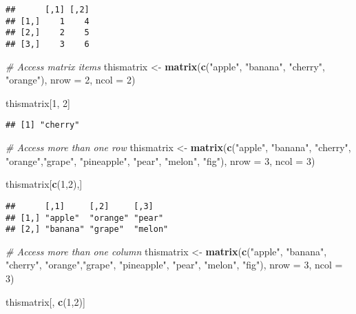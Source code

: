 \documentclass[
]{article}
\newenvironment{Shaded}{\begin{snugshade}}{\end{snugshade}}
\newcommand{\AttributeTok}[1]{\textcolor[rgb]{0.13,0.29,0.53}{#1}}
\newcommand{\CommentTok}[1]{\textcolor[rgb]{0.56,0.35,0.01}{\textit{#1}}}
\newcommand{\DecValTok}[1]{\textcolor[rgb]{0.00,0.00,0.81}{#1}}
\newcommand{\FunctionTok}[1]{\textcolor[rgb]{0.13,0.29,0.53}{\textbf{#1}}}
\newcommand{\NormalTok}[1]{#1}
\newcommand{\OtherTok}[1]{\textcolor[rgb]{0.56,0.35,0.01}{#1}}
\newcommand{\StringTok}[1]{\textcolor[rgb]{0.31,0.60,0.02}{#1}}
\begin{document}
\begin{verbatim}
##      [,1] [,2]
## [1,]    1    4
## [2,]    2    5
## [3,]    3    6
\end{verbatim}

\begin{Shaded}
\begin{Highlighting}[]
\CommentTok{\# Access matrix items}
\NormalTok{thismatrix }\OtherTok{\textless{}{-}} \FunctionTok{matrix}\NormalTok{(}\FunctionTok{c}\NormalTok{(}\StringTok{"apple"}\NormalTok{, }\StringTok{"banana"}\NormalTok{, }\StringTok{"cherry"}\NormalTok{, }\StringTok{"orange"}\NormalTok{), }\AttributeTok{nrow =} \DecValTok{2}\NormalTok{, }\AttributeTok{ncol =} \DecValTok{2}\NormalTok{)}

\NormalTok{thismatrix[}\DecValTok{1}\NormalTok{, }\DecValTok{2}\NormalTok{]}
\end{Highlighting}
\end{Shaded}

\begin{verbatim}
## [1] "cherry"
\end{verbatim}

\begin{Shaded}
\begin{Highlighting}[]
\CommentTok{\# Access more than one row}
\NormalTok{thismatrix }\OtherTok{\textless{}{-}} \FunctionTok{matrix}\NormalTok{(}\FunctionTok{c}\NormalTok{(}\StringTok{"apple"}\NormalTok{, }\StringTok{"banana"}\NormalTok{, }\StringTok{"cherry"}\NormalTok{, }\StringTok{"orange"}\NormalTok{,}\StringTok{"grape"}\NormalTok{, }\StringTok{"pineapple"}\NormalTok{, }\StringTok{"pear"}\NormalTok{, }\StringTok{"melon"}\NormalTok{, }\StringTok{"fig"}\NormalTok{), }\AttributeTok{nrow =} \DecValTok{3}\NormalTok{, }\AttributeTok{ncol =} \DecValTok{3}\NormalTok{)}

\NormalTok{thismatrix[}\FunctionTok{c}\NormalTok{(}\DecValTok{1}\NormalTok{,}\DecValTok{2}\NormalTok{),]}
\end{Highlighting}
\end{Shaded}

\begin{verbatim}
##      [,1]     [,2]     [,3]   
## [1,] "apple"  "orange" "pear" 
## [2,] "banana" "grape"  "melon"
\end{verbatim}

\begin{Shaded}
\begin{Highlighting}[]
\CommentTok{\# Access more than one column}
\NormalTok{thismatrix }\OtherTok{\textless{}{-}} \FunctionTok{matrix}\NormalTok{(}\FunctionTok{c}\NormalTok{(}\StringTok{"apple"}\NormalTok{, }\StringTok{"banana"}\NormalTok{, }\StringTok{"cherry"}\NormalTok{, }\StringTok{"orange"}\NormalTok{,}\StringTok{"grape"}\NormalTok{, }\StringTok{"pineapple"}\NormalTok{, }\StringTok{"pear"}\NormalTok{, }\StringTok{"melon"}\NormalTok{, }\StringTok{"fig"}\NormalTok{), }\AttributeTok{nrow =} \DecValTok{3}\NormalTok{, }\AttributeTok{ncol =} \DecValTok{3}\NormalTok{)}

\NormalTok{thismatrix[, }\FunctionTok{c}\NormalTok{(}\DecValTok{1}\NormalTok{,}\DecValTok{2}\NormalTok{)]}
\end{Highlighting}
\end{Shaded}
\end{document}

